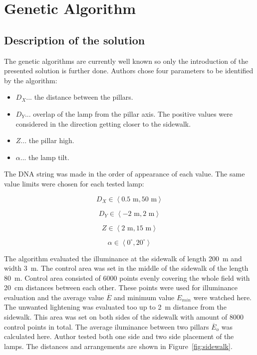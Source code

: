 \section{Genetic Algorithm}
\subsection{Description of the solution}
The genetic algorithms are currently well known so only the introduction of the presented solution is further done. Authors chose four parameters to be identified by the algorithm:

\begin{itemize}
	\item $D_X$... the distance between the pillars.
	\item $D_Y$... overlap of the lamp from the pillar axis. The positive values were considered in the direction getting closer to the sidewalk.
	\item $Z$... the pillar high.
	\item $\alpha$... the lamp tilt.
\end{itemize}

The DNA string was made in the order of appearance of each value. The same value limits were chosen for each tested lamp:

\begin{equation}
D_X \in \left\langle 0.5 \text{ m}, 50 \text{ m}\right\rangle
\end{equation}

\begin{equation}
D_Y \in \left\langle -2 \text{ m}, 2 \text{ m}\right\rangle
\end{equation}

\begin{equation}
Z \in \left\langle 2 \text{ m}, 15 \text{ m}\right\rangle
\end{equation}

\begin{equation}
\alpha \in \left\langle 0^\circ, 20^\circ \right\rangle
\end{equation}

The algorithm evaluated the illuminance at the sidewalk of length 200~m and width 3~m. The control area was set in the middle of the sidewalk of the length 80~m. Control area consisted of 6000 points evenly covering the whole field with 20~cm distances between each other. These points were used for illuminance evaluation and the average value $\overline{E}$ and minimum value $E_{min}$ were watched here. The unwanted lightening was evaluated too up to 2~m distance from the sidewalk. This area was set on both sides of the sidewalk with amount of 8000 control points in total. The average iluminance between two pillars $\overline{E}_o$ was calculated here. Author tested both one side and two side placement of the lamps. The distances and arrangements are shown in Figure~\ref{fig:sidewalk}.

